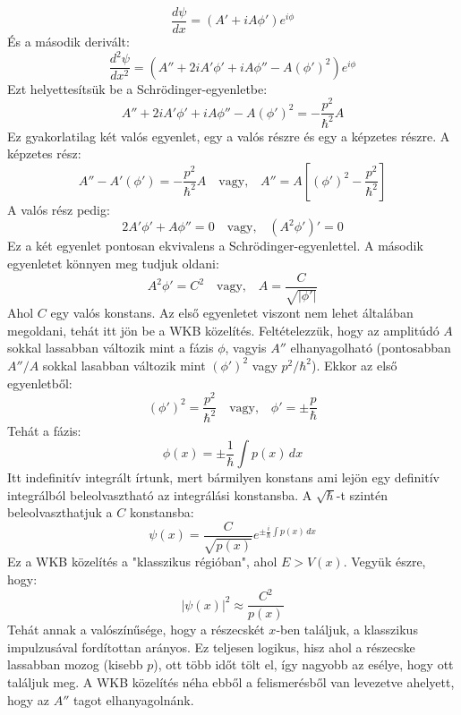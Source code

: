 \documentclass[../main.tex]{subfiles}
\begin{document}
\begin{equation}
    \frac{d \psi}{dx} = \left( A' + i A \phi' \right) e^{i \phi}
\end{equation}
És a második derivált:
\begin{equation}
    \frac{d^2 \psi}{dx^2} = \left( A'' + 2 i A' \phi' + i A \phi'' - A (\phi')^2 \right) e^{i \phi}
\end{equation}
Ezt helyettesítsük be a Schrödinger-egyenletbe:
\begin{equation}
    A'' + 2 i A' \phi' + i A \phi'' - A (\phi')^2 = - \frac{p^2}{\hbar^2} A
\end{equation}
Ez gyakorlatilag két valós egyenlet, egy a valós részre és egy a képzetes részre. A képzetes rész:
\begin{equation}
    A'' - A'(\phi') = - \frac{p^2}{\hbar^2} A \quad \text{vagy,} \quad A'' = A \left[(\phi')^2 - \frac{p^2}{\hbar^2}\right]
\end{equation}
A valós rész pedig:
\begin{equation}
    2 A' \phi' + A \phi'' = 0 \quad \text{vagy,} \quad \left(A^2 \phi'\right)' = 0
\end{equation}
Ez a két egyenlet pontosan ekvivalens a Schrödinger-egyenlettel. A második egyenletet könnyen meg tudjuk oldani:
\begin{equation}
    A^2 \phi' = C^2 \quad \text{vagy,} \quad A = \frac{C}{\sqrt{|\phi'|}}
\end{equation}
Ahol $C$ egy valós konstans. Az első egyenletet viszont nem lehet általában megoldani, tehát itt jön be a WKB közelítés. Feltételezzük, hogy az amplitúdó $A$ sokkal lassabban változik mint a fázis $\phi$,
vagyis $A''$ elhanyagolható (pontosabban $A''/A$ sokkal lasabban változik mint $(\phi')^2$ vagy $p^2/\hbar^2$). Ekkor az első egyenletből:
\begin{equation}
    (\phi')^2 = \frac{p^2}{\hbar^2} \quad \text{vagy,} \quad \phi' = \pm \frac{p}{\hbar}
\end{equation}
Tehát a fázis:
\begin{equation}
    \phi(x) = \pm \frac{1}{\hbar} \int p(x) \, dx
\end{equation}
Itt indefinitív integrált írtunk, mert bármilyen konstans ami lejön egy definitív integrálból beleolvasztható az integrálási konstansba. A $\sqrt{\hbar}$-t szintén beleolvaszthatjuk a $C$ konstansba:
\begin{equation}
    \boxed{\psi(x) = \frac{C}{\sqrt{p(x)}} e^{\pm \frac{i}{\hbar} \int p(x) \, dx}}
\end{equation}
Ez a WKB közelítés a "klasszikus régióban", ahol $E > V(x)$. Vegyük észre, hogy:
\begin{equation}
    |\psi(x)|^2 \approx \frac{C^2}{p(x)}
\end{equation}
Tehát annak a valószínűsége, hogy a részecskét $x$-ben találjuk, a klasszikus impulzusával fordítottan arányos. Ez teljesen logikus, hisz ahol a részecske lassabban mozog (kisebb $p$), ott több időt tölt el, így nagyobb az esélye, hogy ott találjuk meg.
A WKB közelítés néha ebből a felismerésből van levezetve ahelyett, hogy az $A''$ tagot elhanyagolnánk.
\end{document}
